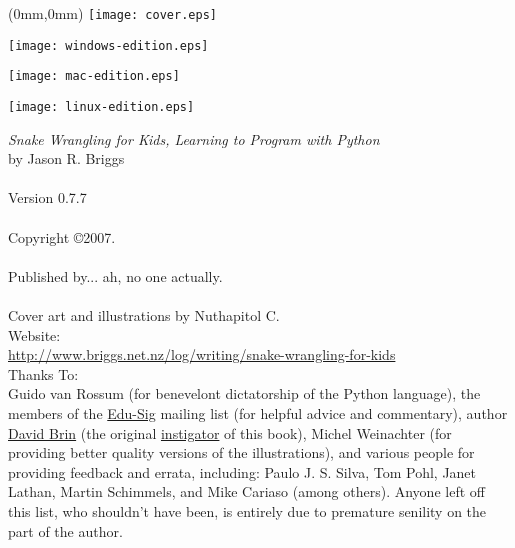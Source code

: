 \pagestyle{empty}
\frontmatter
\begin{FRONTCOVER}
\begin{titlepage}
\begin{textblock*}{210mm}(0mm,0mm)
   \texttt{[image: cover.eps]}
\end{textblock*}
\begin{flushright}
\begin{WINDOWS}
\texttt{[image: windows-edition.eps]} 
\end{WINDOWS}
\begin{MAC}
\texttt{[image: mac-edition.eps]} 
\end{MAC}
\begin{LINUX}
\texttt{[image: linux-edition.eps]} 
\end{LINUX}
\end{flushright}
\end{titlepage}
\end{FRONTCOVER}

\noindent
\textsf{\emph{Snake Wrangling for Kids, Learning to Program with Python}}\\
by Jason R. Briggs\\
\\
Version 0.7.7
\\\\
Copyright \copyright 2007.\\
\\
Published by... ah, no one actually.\\
\\
Cover art and illustrations by Nuthapitol C.\\
\linebreak 
\noindent
Website:\\ \href{http://www.briggs.net.nz/log/writing/snake-wrangling-for-kids}{http://www.briggs.net.nz/log/writing/snake-wrangling-for-kids}\\ 

\noindent
Thanks To:\\
Guido van Rossum (for benevelont dictatorship of the Python language), the members of the \href{http://www.python.org/community/sigs/current/edu-sig/}{Edu-Sig} mailing list (for helpful advice and commentary), author \href{http://www.davidbrin.com/}{David Brin} (the original \href{http://www.salon.com/tech/feature/2006/09/14/basic/}{instigator} of this book), Michel Weinachter (for providing better quality versions of the illustrations), and various people for providing feedback and errata, including: Paulo J. S. Silva, Tom Pohl, Janet Lathan, Martin Schimmels, and Mike Cariaso (among others).  Anyone left off this list, who shouldn't have been, is entirely due to premature senility on the part of the author.\\

